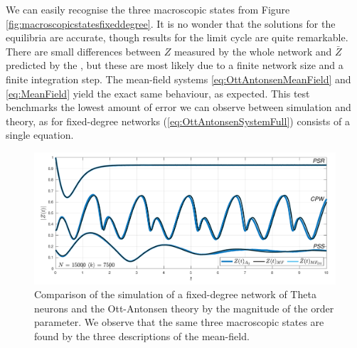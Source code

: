 We can easily recognise the three macroscopic states from Figure \ref{fig:macroscopicstatesfixeddegree}. It is no wonder that the solutions for the equilibria are accurate, though results for the limit cycle are quite remarkable. There are small differences between $Z$ measured by the whole network and $\bar{Z}$ predicted by the \MFR, but these are most likely due to a finite network size and a finite integration step. The mean-field systems \eqref{eq:OttAntonsenMeanField} and \eqref{eq:MeanField} yield the exact same behaviour, as expected. This test benchmarks the lowest amount of error we can observe between simulation and theory, as for fixed-degree networks (\ref{eq:OttAntonsenSystemFull}) consists of a single equation.
\begin{figure}[H]
\centering
\includegraphics[width = \textwidth, trim={0 3mm 0 3mm},clip]{../Figures/InspectMeanFieldFixedDegree.pdf}
\caption{Comparison of the simulation of a fixed-degree network of Theta neurons and the Ott-Antonsen theory by the magnitude of the order parameter. We observe that the same three macroscopic states are found by the three descriptions of the mean-field.}
\label{fig:InspectMeanFieldFixedDegree}
\end{figure}


